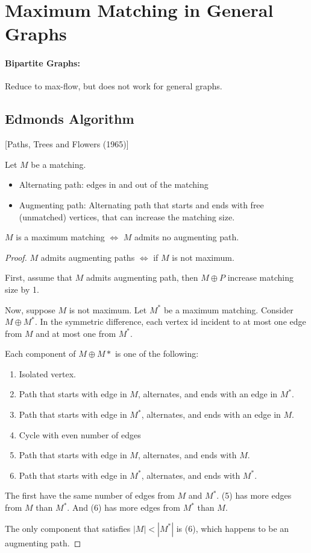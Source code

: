 \section{Maximum Matching in General Graphs}

\paragraph{Bipartite Graphs:} Reduce to max-flow, but does not work for general graphs.

\subsection{Edmonds Algorithm}[Paths, Trees and Flowers (1965)]

Let $M$ be a matching.

\begin{itemize}
\item Alternating path: edges in and out of the matching
\item Augmenting path: Alternating path that starts and ends with free (unmatched) vertices, that can increase the matching size.
\end{itemize}

\begin{mylemma}
$M$ is a maximum matching $\iff$ $M$ admits no augmenting path.
\end{mylemma}
\begin{proof}
$M$ admits augmenting paths $\iff$ if $M$ is not maximum.

First, assume that $M$ admits augmenting path, then $M \oplus P$ increase matching size by 1.

Now, suppose $M$ is not maximum. Let $M^*$ be a maximum matching. Consider $M \oplus M^*$. In the symmetric difference, each vertex id incident to at most one edge from $M$ and at most one from $M^*$.

Each component of $M \oplus M*$ is one of the following: 
\begin{enumerate}
\item Isolated vertex. 
\item Path that starts with edge in $M$, alternates, and ends with an edge in $M^*$.
\item Path that starts with edge in $M^*$, alternates, and ends with an edge in $M$.
\item Cycle with even number of edges
\item Path that starts with edge in $M$, alternates, and ends with $M$.
\item Path that starts with edge in $M^*$, alternates, and ends with $M^*$.
\end{enumerate}

The first have the same number of edges from $M$ and $M^*$. (5) has more edges from $M$ than $M^*$. And (6) has more edges from $M^*$ than $M$.

The only component that satisfies $|M| < |M^*|$ is (6), which happens to be an augmenting path.
\end{proof}

